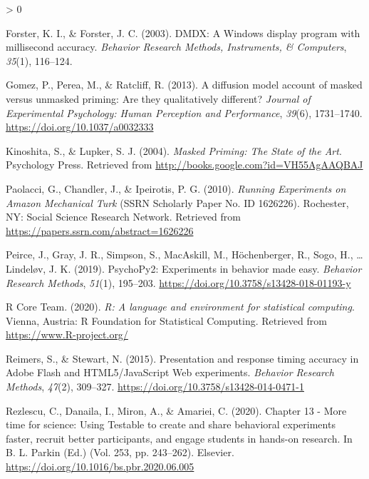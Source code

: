 \documentclass[
  english,
  man]{apa6}
\newlength{\cslhangindent}
\newenvironment{CSLReferences}[2] %
 {%
  \setlength{\parindent}{0pt}
  \ifodd #1 \everypar{\setlength{\hangindent}{\cslhangindent}}\ignorespaces\fi
  \ifnum #2 > 0
  \setlength{\parskip}{#2\baselineskip}
  \fi
 }%
 {}
\begin{document}
\begin{CSLReferences}{1}{0}
\leavevmode\hypertarget{ref-forsterDMDXWindowsDisplay2003}{}%
Forster, K. I., \& Forster, J. C. (2003). {DMDX}: {A Windows} display program with millisecond accuracy. \emph{Behavior Research Methods, Instruments, \& Computers}, \emph{35}(1), 116--124.

\leavevmode\hypertarget{ref-gomezDiffusionModelAccount2013}{}%
Gomez, P., Perea, M., \& Ratcliff, R. (2013). A diffusion model account of masked versus unmasked priming: {Are} they qualitatively different? \emph{Journal of Experimental Psychology: Human Perception and Performance}, \emph{39}(6), 1731--1740. \url{https://doi.org/10.1037/a0032333}

\leavevmode\hypertarget{ref-kinoshitaMaskedPrimingState2004}{}%
Kinoshita, S., \& Lupker, S. J. (2004). \emph{Masked {Priming}: {The State} of the {Art}}. {Psychology Press}. Retrieved from \url{http://books.google.com?id=VH55AgAAQBAJ}

\leavevmode\hypertarget{ref-paolacciRunningExperimentsAmazon2010}{}%
Paolacci, G., Chandler, J., \& Ipeirotis, P. G. (2010). \emph{Running {Experiments} on {Amazon Mechanical Turk}} (SSRN Scholarly Paper No. ID 1626226). {Rochester, NY}: {Social Science Research Network}. Retrieved from \url{https://papers.ssrn.com/abstract=1626226}

\leavevmode\hypertarget{ref-peirce2019}{}%
Peirce, J., Gray, J. R., Simpson, S., MacAskill, M., Höchenberger, R., Sogo, H., \ldots{} Lindeløv, J. K. (2019). PsychoPy2: Experiments in behavior made easy. \emph{Behavior Research Methods}, \emph{51}(1), 195--203. \url{https://doi.org/10.3758/s13428-018-01193-y}

\leavevmode\hypertarget{ref-R-base}{}%
R Core Team. (2020). \emph{R: A language and environment for statistical computing}. Vienna, Austria: R Foundation for Statistical Computing. Retrieved from \url{https://www.R-project.org/}

\leavevmode\hypertarget{ref-reimersPresentationResponseTiming2015}{}%
Reimers, S., \& Stewart, N. (2015). Presentation and response timing accuracy in {Adobe Flash} and {HTML5}/{JavaScript Web} experiments. \emph{Behavior Research Methods}, \emph{47}(2), 309--327. \url{https://doi.org/10.3758/s13428-014-0471-1}

\leavevmode\hypertarget{ref-rezlescu2020}{}%
Rezlescu, C., Danaila, I., Miron, A., \& Amariei, C. (2020). Chapter 13 - More time for science: Using Testable to create and share behavioral experiments faster, recruit better participants, and engage students in hands-on research. In B. L. Parkin (Ed.) (Vol. 253, pp. 243--262). Elsevier. \url{https://doi.org/10.1016/bs.pbr.2020.06.005}


\end{CSLReferences}
\end{document}
